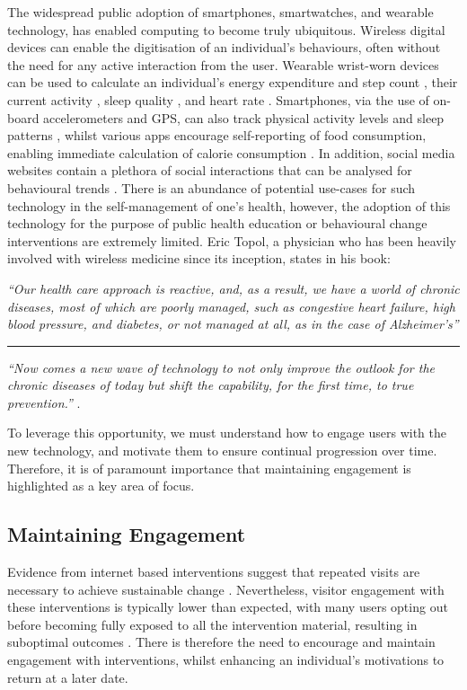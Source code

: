 The widespread public adoption of smartphones, smartwatches, and wearable technology, has enabled computing to become truly ubiquitous. Wireless digital devices can enable the digitisation of an individual's behaviours, often without the need for any active interaction from the user. Wearable wrist-worn devices can be used to calculate an individual’s energy expenditure and step count \cite{Pande2013}, their current activity \cite{Cleland2013}, sleep quality \cite{Noor2013}, and heart rate \cite{Parak2014}. Smartphones, via the use of on-board accelerometers and GPS, can also track physical activity levels \cite{Ozdalga2012} and sleep patterns \cite{Min2014}, whilst various apps encourage self-reporting of food consumption, enabling immediate calculation of calorie consumption \cite{Ozdalga2012}. In addition, social media websites contain a plethora of social interactions that can be analysed for behavioural trends \cite{Ruths2014}. There is an abundance of potential use-cases for such technology in the self-management of one’s health, however, the adoption of this technology for the purpose of public health education or behavioural change interventions are extremely limited. Eric Topol, a physician who has been heavily involved with wireless medicine since its inception, states in his book:
\begin{displayquote}
\textit{``Our health care approach is reactive, and, as a result, we have a world of chronic diseases, most of which are poorly managed, such as congestive heart failure, high blood pressure, and diabetes, or not managed at all, as in the case of Alzheimer’s''}
\begin{center}
	\rule{1cm}{0.4pt}
\end{center}
\textit{``Now comes a new wave of technology to not only improve the outlook for the chronic diseases of today but shift the capability, for the first time, to true prevention.''} \cite{Topol2012}.
\end{displayquote}

To leverage this opportunity, we must understand how to engage users with the new technology, and motivate them to ensure continual progression over time. Therefore, it is of paramount importance that maintaining engagement is highlighted as a key area of focus.

\subsection{Maintaining Engagement}
Evidence from internet based interventions suggest that repeated visits are necessary to achieve sustainable change \cite{Brouwer2011a}. Nevertheless, visitor engagement with these interventions is typically lower than expected, with many users opting out before becoming fully exposed to all the intervention material, resulting in suboptimal outcomes \cite{Brouwer2011a}. There is therefore the need to encourage and maintain engagement with interventions, whilst enhancing an individual’s motivations to return at a later date.

